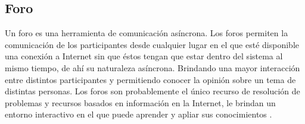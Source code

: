 
\subsection{Foro}

Un foro es una herramienta de comunicación asíncrona. Los foros permiten la comunicación de los participantes desde 
cualquier lugar en el que  esté  disponible  una  conexión  a Internet  sin  que  éstos  tengan  que  estar dentro del 
sistema al mismo tiempo, de ahí su naturaleza asíncrona. Brindando una mayor interacción entre distintos 
participantes y permitiendo conocer la opinión sobre un tema de distintas personas.
Los foros son probablemente el único recurso de resolución de problemas y recursos basados en información en la Internet, 
le brindan un entorno interactivo en el que puede aprender y apliar sus conocimientos \citep{CTForum}.
